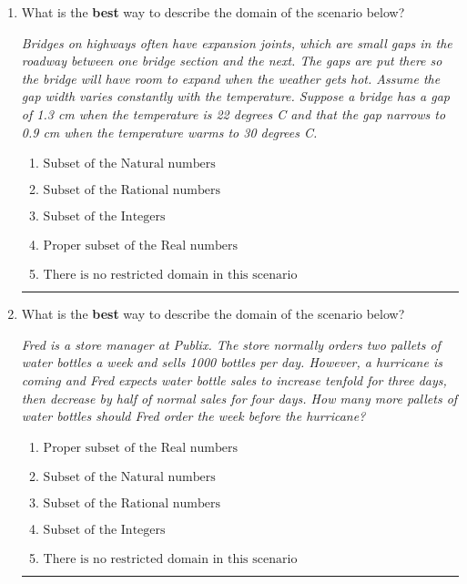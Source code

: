 \documentclass[14pt]{extbook}
\newcommand{\litem}[1]{\item#1\hspace*{-1cm}\rule{\textwidth}{0.4pt}}
\begin{document}
\begin{enumerate}
{\begin{enumerate}[label=\Alph*.]
\end{enumerate} }
\litem{
What is the \textbf{best} way to describe the domain of the scenario below?
\begin{center}
    \textit{ Bridges on highways often have expansion joints, which are small gaps in the roadway between one bridge section and the next. The gaps are put there so the bridge will have room to expand when the weather gets hot. Assume the gap width varies constantly with the temperature. Suppose a bridge has a gap of 1.3 cm when the temperature is 22 degrees C and that the gap narrows to 0.9 cm when the temperature warms to 30 degrees C. }
\end{center}
\begin{enumerate}[label=\Alph*.]
\item \( \text{Subset of the Natural numbers} \)
\item \( \text{Subset of the Rational numbers} \)
\item \( \text{Subset of the Integers} \)
\item \( \text{Proper subset of the Real numbers} \)
\item \( \text{There is no restricted domain in this scenario} \)

\end{enumerate} }
\litem{
What is the \textbf{best} way to describe the domain of the scenario below?
\begin{center}
    \textit{ Fred is a store manager at Publix. The store normally orders two pallets of water bottles a week and sells 1000 bottles per day. However, a hurricane is coming and Fred expects water bottle sales to increase tenfold for three days, then decrease by half of normal sales for four days. How many more pallets of water bottles should Fred order the week before the hurricane? }
\end{center}
\begin{enumerate}[label=\Alph*.]
\item \( \text{Proper subset of the Real numbers} \)
\item \( \text{Subset of the Natural numbers} \)
\item \( \text{Subset of the Rational numbers} \)
\item \( \text{Subset of the Integers} \)
\item \( \text{There is no restricted domain in this scenario} \)


\end{enumerate}}
\end{enumerate}
\end{document}
